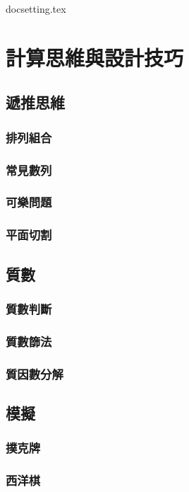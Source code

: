 \documentclass[12pt,a4paper,oneside]{report}
\begin{document}
\begin{CJK}{UTF8}{bkai}

{docsetting.tex}
\setcounter{chapter}{3}

\fi

\chapter{計算思維與設計技巧}

\section{遞推思維}

\subsection{排列組合}
\subsection{常見數列}
\subsection{可樂問題}
\subsection{平面切割}

\section{質數}

\subsection{質數判斷}
\subsection{質數篩法}
\subsection{質因數分解}

\section{模擬}

\subsection{撲克牌}
\subsection{西洋棋}

\ifx \allfiles \undefined

\printindex

\clearpage
\end{CJK}
\end{document}
